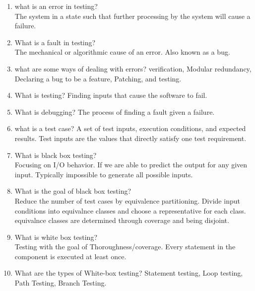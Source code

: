 \documentclass[10pt]{article}
\begin{document}
\begin{enumerate}
      \item what is an error in testing?\\
            The system in a state such that further processing by the system will cause a failure.\\

      \item What is a fault in testing?\\
            The mechanical or algorithmic cause of an error. Also known as a bug.\\


      \item what are some ways of dealing with errors?
            verification, Modular redundancy, Declaring a bug to be a feature, Patching, and testing.

      \item What is testing?
            Finding inputs that cause the software to fail.

      \item What is debugging?
            The process of finding a fault given a failure.\\

      \item what is a test case?
            A set of test inputs, execution conditions, and expected results. Test inputs are the values that directly satisfy one test requirement.

      \item What is black box testing?\\
            Focusing on I/O behavior. If we are able to predict the output for any given input. Typically impossible to generate all possible inputs.\\
      \item What is the goal of black box testing?\\
            Reduce the number of test cases by equivalence partitioning. Divide input conditions into equivalnce classes and choose a representative for each class.\\
            equivalnce classes are determined through coverage and being disjoint.

      \item What is white box testing?\\
            Testing with the goal of Thoroughness/coverage. Every statement in the component is executed at least once.\\

      \item What are the types of White-box testing?
            Statement testing, Loop testing, Path Testing, Branch Testing.\\


\end{enumerate}
\end{document}
